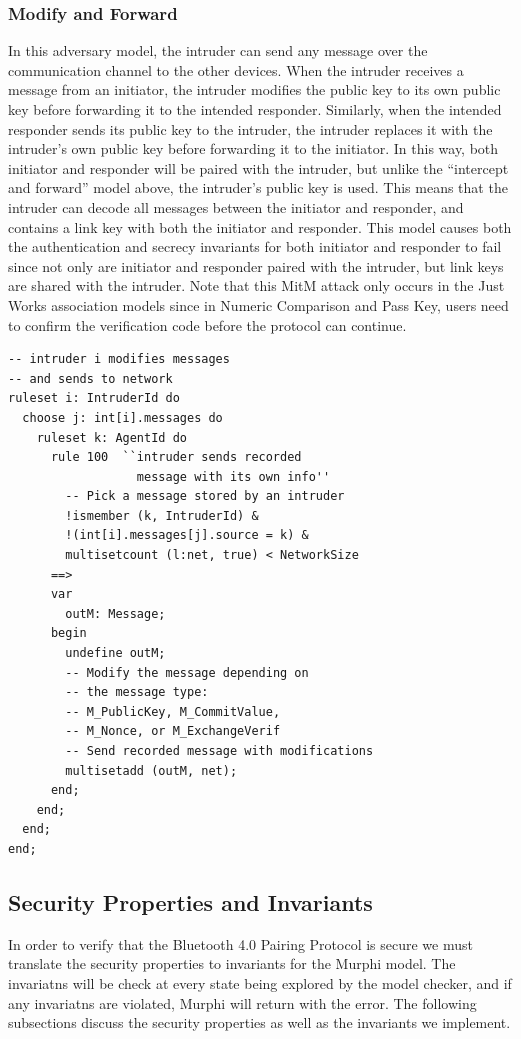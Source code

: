 \documentclass{acm_proc_article-sp}
\begin{document}
\subsubsection{Modify and Forward}
In this adversary model, the intruder can send any message over the communication channel to the other devices. When the intruder receives a message from an initiator, the intruder modifies the public key to its own public key before forwarding it to the intended responder. Similarly, when the intended responder sends its public key to the intruder, the intruder replaces it with the intruder's own public key before forwarding it to the initiator. In this way, both initiator and responder will be paired with the intruder, but unlike the ``intercept and forward'' model above, the intruder's public key is used. This means that the intruder can decode all messages between the initiator and responder, and contains a link key with both the initiator and responder. This model causes both the authentication and secrecy invariants for both initiator and responder to fail since not only are initiator and responder paired with the intruder, but link keys are shared with the intruder. Note that this MitM attack only occurs in the Just Works association models since in Numeric Comparison and Pass Key, users need to confirm the verification code before the protocol can continue.

\begin{verbatim}
-- intruder i modifies messages
-- and sends to network
ruleset i: IntruderId do
  choose j: int[i].messages do
    ruleset k: AgentId do
      rule 100  ``intruder sends recorded
                  message with its own info''
        -- Pick a message stored by an intruder
        !ismember (k, IntruderId) &
        !(int[i].messages[j].source = k) &
        multisetcount (l:net, true) < NetworkSize
      ==>
      var
        outM: Message;
      begin
        undefine outM;
        -- Modify the message depending on 
        -- the message type:
        -- M_PublicKey, M_CommitValue,
        -- M_Nonce, or M_ExchangeVerif
        -- Send recorded message with modifications
        multisetadd (outM, net);
      end;
    end;
  end;
end;
\end{verbatim}

\subsection{Security Properties and Invariants}
In order to verify that the Bluetooth 4.0 Pairing Protocol is secure we must translate the security properties to invariants for the Murphi model. The invariatns will be check at every state being explored by the model checker, and if any invariatns are violated, Murphi will return with the error. The following subsections discuss the security properties as well as the invariants we implement.
\end{document}
